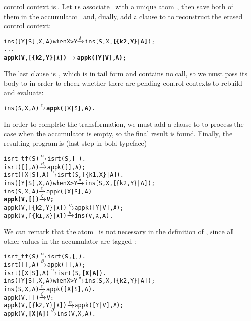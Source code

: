 control context is \erlcode{[Y|\textvisiblespace]}. Let us
associate~ with a unique atom~, then save both
of them in the accumulator~ and, dually, add a clause to
 to reconstruct the erased control context:
\begin{alltt}
ins([Y|S],X,A) when X > Y \(\smashedrightarrow{\delta}\) ins(S,X,\textbf{[\{k2,Y\}|A]});
...
\textbf{appk(V,[\{k2,Y\}|A])        \(\rightarrow\) appk([Y|V],A);}
\end{alltt}
The last clause is~\clause{\epsilon}, which is in tail form and
contains no call, so we must pass its body to  in
order to check whether there are pending control contexts to rebuild
and evaluate:
\begin{alltt}
ins(    S,X,A)            \(\smashedrightarrow{\epsilon}\) \textbf{appk(}[X|S],\textbf{A)}.
\end{alltt}
In order to complete the transformation, we must add a clause
to  to process the case when the accumulator is empty,
so the final result is found. Finally, the resulting program is (last
step in bold typeface)\label{isrt_tf_appk}
\begin{alltt}
isrt\_tf(S)                \(\smashedrightarrow{\alpha}\) isrt(S,[]).
isrt(   [],A)             \(\smashedrightarrow{\beta}\) appk([],A);
isrt([X|S],A)             \(\smashedrightarrow{\gamma}\) isrt(S,[\{k1,X\}|A]).
ins([Y|S],X,A) when X > Y \(\smashedrightarrow{\delta}\) ins(S,X,[\{k2,Y\}|A]);
ins(    S,X,A)            \(\smashedrightarrow{\epsilon}\) appk([X|S],A).
\textbf{appk(V,        [])        \(\smashedrightarrow{\zeta}\) V;}
appk(V,[\{k2,Y\}|A])        \(\smashedrightarrow{\eta}\) appk([Y|V],A);
appk(V,[\{k1,X\}|A])        \(\smashedrightarrow{\theta}\) ins(V,X,A).
\end{alltt}
We can remark that the atom~ is not necessary in the
definition of , since all other values in the
accumulator are tagged~:
\begin{alltt}
isrt\_tf(S)                \(\smashedrightarrow{\alpha}\) isrt(S,[]).
isrt(   [],A)             \(\smashedrightarrow{\beta}\) appk([],A);
isrt([X|S],A)             \(\smashedrightarrow{\gamma}\) isrt(S,\textbf{[X|A]}).\hfill% \emph{Here}
ins([Y|S],X,A) when X > Y \(\smashedrightarrow{\delta}\) ins(S,X,[\{k2,Y\}|A]);
ins(    S,X,A)            \(\smashedrightarrow{\epsilon}\) appk([X|S],A).
appk(V,        [])        \(\smashedrightarrow{\zeta}\) V;
appk(V,[\{k2,Y\}|A])        \(\smashedrightarrow{\eta}\) appk([Y|V],A);
appk(V,     \textbf{[X|A]})        \(\smashedrightarrow{\theta}\) ins(V,X,A).\hfill% \emph{and here}
\end{alltt}
